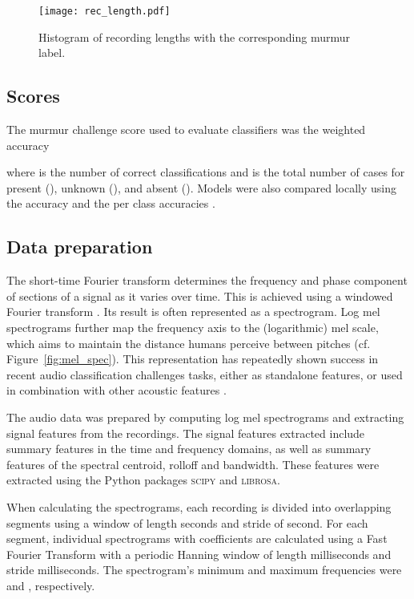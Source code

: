\documentclass[twocolumn]{cinc}
\begin{document}
\begin{figure}[htbp]
\texttt{[image: rec\_length.pdf]}
\caption{Histogram of recording lengths with the corresponding murmur label.}
\label{fig:rec_length}
\end{figure}



\subsection{Scores} The murmur challenge score used to evaluate classifiers was the weighted accuracy 

where  is the number of correct classifications and  is the total number of cases for present (), unknown (), and absent (). Models were also compared locally using the accuracy  and the per class accuracies .






\subsection{Data preparation} 

The short-time Fourier transform determines the frequency and phase component of sections of a signal as it varies over time. This is achieved using a windowed Fourier transform \cite{SEJDIC2009153}. Its result is often represented as a spectrogram. Log mel spectrograms further map the frequency axis to the (logarithmic) mel scale, which aims to maintain the distance humans perceive between pitches (cf. Figure~\ref{fig:mel_spec}). This representation has repeatedly shown success in recent audio classification challenges tasks, either as standalone features, or used in combination with other acoustic features \cite{Challenge,dcasetask42021}.

The audio data was prepared by computing log mel spectrograms and extracting signal features from the recordings. The signal features extracted include summary features in the time and frequency domains, as well as summary features of the spectral centroid, rolloff and bandwidth. These features were extracted using the Python packages \textsc{scipy} and \textsc{librosa}. 

When calculating the spectrograms, each recording is divided into overlapping segments using a window of length  seconds and stride of  second. For each segment, individual spectrograms with  coefficients are calculated using a Fast Fourier Transform with a periodic Hanning window of length  milliseconds and stride  milliseconds. The spectrogram's minimum and maximum frequencies were  and , respectively.
\end{document}
